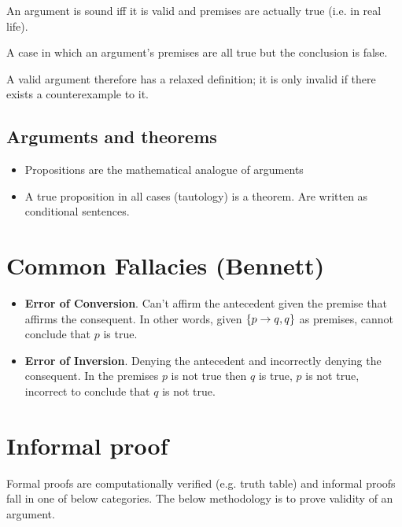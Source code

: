 \begin{definition} [Soundness]
    An argument is sound iff it is valid and premises are actually true (i.e. in real life).
\end{definition}

\begin{definition}[Counterexample]
    A case in which an argument's premises are all true but the conclusion is false.
\end{definition}

A valid argument therefore has a relaxed definition; it is only invalid if there exists a counterexample to it.

\subsection{Arguments and theorems}

\begin{itemize}
    \item Propositions are the mathematical analogue of arguments
    \item A true proposition in all cases (tautology) is a theorem. Are written as conditional sentences.
\end{itemize}

\section{Common Fallacies (Bennett)}

\begin{itemize}
    \item \textbf{Error of Conversion}. Can't affirm the antecedent given the premise that affirms the consequent. In other words, given $\{p\rightarrow q,q\}$ as premises, cannot conclude that $p$ is true.
    \item \textbf{Error of Inversion}. Denying the antecedent and incorrectly denying the consequent. In the premises $p$ is not true then $q$ is true, $p$ is not true, incorrect to conclude that $q$ is not true.
\end{itemize}

\section{Informal proof}

Formal proofs are computationally verified (e.g. truth table) and informal proofs fall in one of below categories.
The below methodology is to prove validity of an argument.

